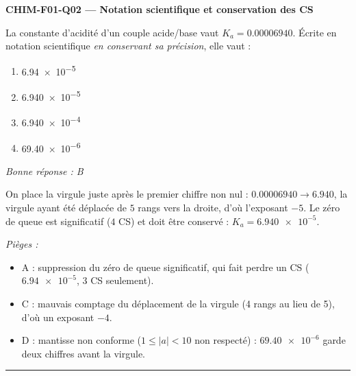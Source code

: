 \documentclass[11pt,a4paper]{article}
\begin{document}
\noindent\textbf{CHIM-F01-Q02 --- Notation scientifique et conservation des CS}\par
La constante d'acidité d'un couple acide/base vaut $K_a = \num{0.00006940}$. Écrite en notation scientifique \emph{en conservant sa précision}, elle vaut :
\begin{enumerate}[label=\Alph*)]
\item \num{6.94e-5}
\item \num{6.940e-5}
\item \num{6.940e-4}
\item \num{69.40e-6}
\end{enumerate}
\textit{Bonne réponse : B}\par
On place la virgule juste après le premier chiffre non nul : $\num{0.00006940} \to \num{6.940}$, la virgule ayant été déplacée de $5$ rangs vers la droite, d'où l'exposant $-5$. Le zéro de queue est significatif ($4$ CS) et doit être conservé : $K_a = \num{6.940e-5}$.\par
\textit{Pièges :}
\begin{itemize}
\item A : suppression du zéro de queue significatif, qui fait perdre un CS ($\num{6.94e-5}$, 3 CS seulement).
\item C : mauvais comptage du déplacement de la virgule (4 rangs au lieu de 5), d'où un exposant $-4$.
\item D : mantisse non conforme ($1 \le |a| < 10$ non respecté) : $\num{69.40e-6}$ garde deux chiffres avant la virgule.
\end{itemize}
\vspace{6pt}\hrule\vspace{8pt}
\end{document}
